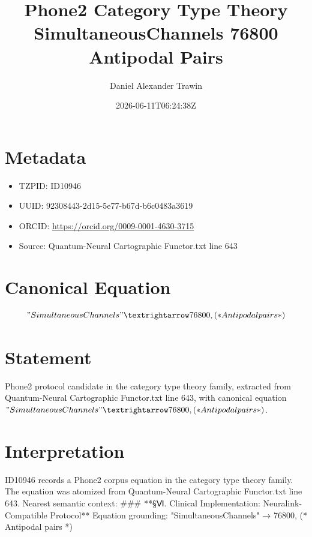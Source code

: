 \documentclass[11pt]{article}
\title{Phone2 Category Type Theory SimultaneousChannels 76800 Antipodal Pairs}
\author{Daniel Alexander Trawin}
\date{2026-06-11T06:24:38Z}
\begin{document}
\maketitle
\section*{Metadata}
\begin{itemize}
\item TZPID: ID10946
\item UUID: 92308443-2d15-5e77-b67d-b6c0483a3619
\item ORCID: \url{https://orcid.org/0009-0001-4630-3715}
\item Source: Quantum-Neural Cartographic Functor.txt line 643
\end{itemize}
\section*{Canonical Equation}
\[
"SimultaneousChannels" → 76800, (* Antipodal pairs *)
\]
\section*{Statement}
Phone2 protocol candidate in the category type theory family, extracted from Quantum-Neural Cartographic Functor.txt line 643, with canonical equation $"SimultaneousChannels" → 76800, (* Antipodal pairs *)$.
\section*{Interpretation}
ID10946 records a Phone2 corpus equation in the category type theory family. The equation was atomized from Quantum-Neural Cartographic Functor.txt line 643. Nearest semantic context: ### **§Ⅵ. Clinical Implementation: Neuralink-Compatible Protocol** Equation grounding: "SimultaneousChannels" → 76800, (* Antipodal pairs *)
\end{document}
